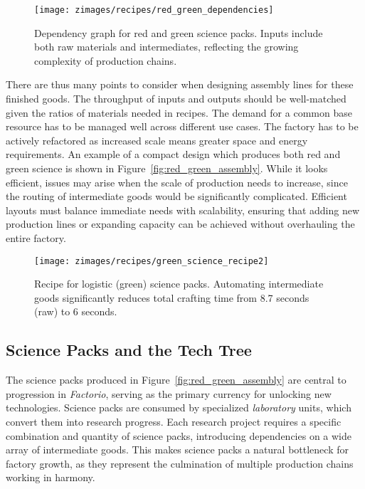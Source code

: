 \begin{figure}[ht]
    \centering
    \texttt{[image: zimages/recipes/red\_green\_dependencies]}
    \caption{Dependency graph for red and green science packs. Inputs include both raw materials and intermediates, reflecting the growing complexity of production chains.}
    \label{fig:red_green_dependencies}
\end{figure}


There are thus many points to consider when designing assembly lines for these finished goods. The throughput of inputs and outputs should be well-matched given the ratios of materials needed in recipes. The demand for a common base resource has to be managed well across different use cases. The factory has to be actively refactored as increased scale means greater space and energy requirements. An example of a compact design which produces both red and green science is shown in Figure~\ref{fig:red_green_assembly}. While it looks efficient, issues may arise when the scale of production needs to increase, since the routing of intermediate goods would be significantly complicated. Efficient layouts must balance immediate needs with scalability, ensuring that adding new production lines or expanding capacity can be achieved without overhauling the entire factory.

\begin{figure}[ht]
    \centering
    \texttt{[image: zimages/recipes/green\_science\_recipe2]}
    \caption{Recipe for logistic (green) science packs. Automating intermediate goods significantly reduces total crafting time from 8.7 seconds (raw) to 6 seconds.}
    \label{fig:green_science_recipe}
\end{figure}



\subsection{Science Packs and the Tech Tree}
The science packs produced in Figure~\ref{fig:red_green_assembly} are central to progression in \textit{Factorio}, serving as the primary currency for unlocking new technologies. Science packs are consumed by specialized \textit{laboratory} units, which convert them into research progress. Each research project requires a specific combination and quantity of science packs, introducing dependencies on a wide array of intermediate goods. This makes science packs a natural bottleneck for factory growth, as they represent the culmination of multiple production chains working in harmony.

